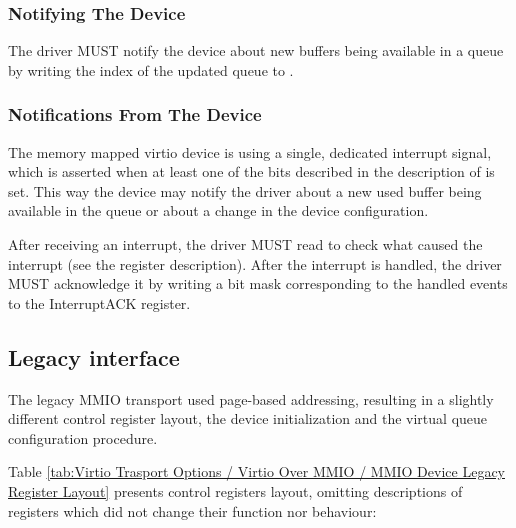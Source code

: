 \subsubsection{Notifying The Device}\label{sec:Virtio Transport Options / Virtio Over MMIO / MMIO-specific Initialization And Device Operation / Notifying The Device}

The driver MUST notify the device about new buffers being available in
a queue by writing the index of the updated queue to .

\subsubsection{Notifications From The Device}\label{sec:Virtio Transport Options / Virtio Over MMIO / MMIO-specific Initialization And Device Operation / Notifications From The Device}

The memory mapped virtio device is using a single, dedicated
interrupt signal, which is asserted when at least one of the
bits described in the description of 
is set. This way the device may notify the
driver about a new used buffer being available in the queue
or about a change in the device configuration.

After receiving an interrupt, the driver MUST read
 to check what caused the interrupt
(see the register description). After the interrupt is handled,
the driver MUST acknowledge it by writing a bit mask
corresponding to the handled events to the InterruptACK register.

\subsection{Legacy interface}\label{sec:Virtio Transport Options / Virtio Over MMIO / Legacy interface}

The legacy MMIO transport used page-based addressing, resulting
in a slightly different control register layout, the device
initialization and the virtual queue configuration procedure.

Table \ref{tab:Virtio Trasport Options / Virtio Over MMIO / MMIO Device Legacy Register Layout} 
presents control registers layout, omitting
descriptions of registers which did not change their function
nor behaviour:

